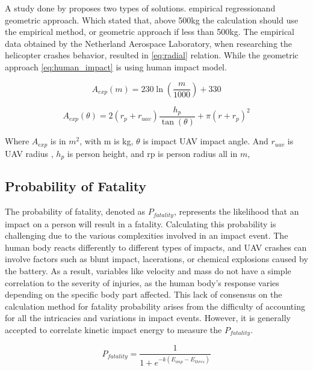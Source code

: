 \documentclass[12pt]{report}
\begin{document}
        A study done by \cite{aalmoes_conceptual_2015} proposes two types of solutions. empirical regressionand geometric approach. Which stated
        that, above 500kg the calculation should use the empirical method, or geometric approach if less than 500kg. The
        empirical data obtained by the Netherland Aerospace Laboratory, when researching the helicopter crashes
        behavior, resulted in \ref{eq:radial} relation. While the geometric approach \ref{eq:human_impact} is using
        human impact model.

        \begin{equation}\label{eq:human_impact}
            A_{exp}(m) = 230 \ln \left( \frac{m}{1000} \right) + 330
        \end{equation}

        \begin{equation}\label{eq:radial}
            A_{exp}(\theta) = 2 (r_p + r_{uav}) \frac{h_p}{\tan(\theta)} + \pi (r + r_p)^2
        \end{equation}

        Where \(A_{exp}\) is in \(m^2\), with m is kg, \(\theta\) is impact UAV impact angle. And \(r_{uav}\) is UAV
        radius , \(h_p\) is person height, and rp is person radius all in \(m\),

        \subsection{Probability of Fatality}
        The probability of fatality, denoted as \(P_{fatality}\), represents the likelihood that an impact on a person
        will result in a fatality. Calculating this probability is challenging due to the various complexities involved
        in an impact event. The human body reacts differently to different types of impacts, and UAV crashes can involve
        factors such as blunt impact, lacerations, or chemical explosions caused by the battery. As a result, variables
        like velocity and mass do not have a simple correlation to the severity of injuries, as the human body's
        response varies depending on the specific body part affected. This lack of consensus on the calculation method
        for fatality probability arises from the difficulty of accounting for all the intricacies and variations in
        impact events. However, it is generally accepted to correlate kinetic impact energy to measure the
        \(P_{fatality}\).

        \begin{equation}\label{eq:fatality}
            P_{fatality} = \frac{1}{1 + e^{-k(E_{imp} - E_{thres})}}
        \end{equation}
\end{document}
